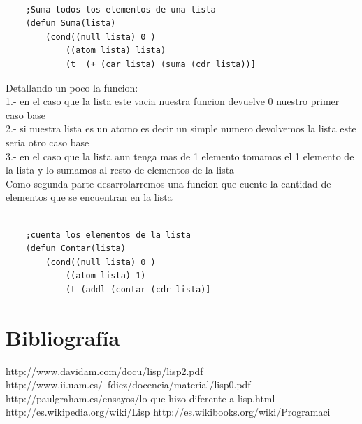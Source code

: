 \documentclass[11pt]{article} %
\begin{document}
\begin{lstlisting}[frame=single]
	
	;Suma todos los elementos de una lista
	(defun Suma(lista)
		(cond((null lista) 0 )
			((atom lista) lista)
			(t  (+ (car lista) (suma (cdr lista))] 
\end{lstlisting}

Detallando un poco la funcion:\\
1.- en el caso que la lista este vacia nuestra funcion devuelve 0 nuestro primer caso base\\
2.- si nuestra lista es un atomo es decir un simple numero devolvemos la lista este seria otro caso base\\
3.- en el caso que la lista aun tenga mas de 1 elemento tomamos el 1 elemento de la lista y lo sumamos al resto de elementos de la lista\\

Como segunda parte desarrolarremos una funcion que cuente la cantidad de elementos que se encuentran en la lista

\lstset{language=LISP}          %

\begin{lstlisting}[frame=single]
	
	;cuenta los elementos de la lista
	(defun Contar(lista)
		(cond((null lista) 0 )
			((atom lista) 1)
			(t (addl (contar (cdr lista)] 
\end{lstlisting}

\section{Bibliografía}


http://www.davidam.com/docu/lisp/lisp2.pdf
http://www.ii.uam.es/~fdiez/docencia/material/lisp0.pdf
http://paulgraham.es/ensayos/lo-que-hizo-diferente-a-lisp.html
http://es.wikipedia.org/wiki/Lisp
http://es.wikibooks.org/wiki/Programaci%
  
\end{document}
